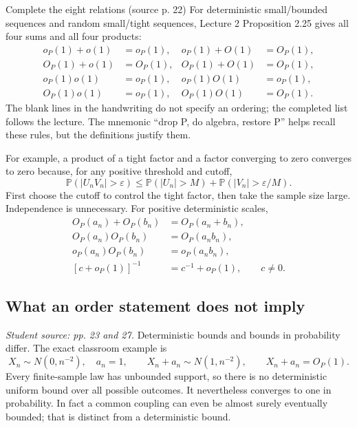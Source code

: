 \documentclass[12pt]{article}
\newcommand{\Prob}{\mathbb P}
\begin{document}
\begin{todobox}{Complete the eight relations (source p. 22)}
For deterministic small/bounded sequences and random small/tight sequences,
Lecture 2 Proposition 2.25 gives all four sums and all four products:
\begin{align}
 o_P(1)+o(1)&=o_P(1),& o_P(1)+O(1)&=O_P(1),\\
 O_P(1)+o(1)&=O_P(1),& O_P(1)+O(1)&=O_P(1),\\
 o_P(1)o(1)&=o_P(1),& o_P(1)O(1)&=o_P(1),\\
 O_P(1)o(1)&=o_P(1),& O_P(1)O(1)&=O_P(1).
\end{align}
The blank lines in the handwriting do not specify an ordering; the completed
list follows the lecture. The mnemonic ``drop P, do algebra, restore P''
helps recall these rules, but the definitions justify them.
\end{todobox}
For example, a product of a tight factor and a factor converging to zero
converges to zero because, for any positive threshold and cutoff,
\begin{equation}
 \Prob(|U_nV_n|>\varepsilon)
 \le \Prob(|U_n|>M)+\Prob(|V_n|>\varepsilon/M).
\end{equation}
First choose the cutoff to control the tight factor, then take the sample
size large. Independence is unnecessary. For positive deterministic scales,
\begin{align}
 O_P(a_n)+O_P(b_n)&=O_P(a_n+b_n),\\
 O_P(a_n)O_P(b_n)&=O_P(a_nb_n),\\
 o_P(a_n)O_P(b_n)&=o_P(a_nb_n),\\
 [c+o_P(1)]^{-1}&=c^{-1}+o_P(1),\qquad c\ne0.
\end{align}

\subsection{What an order statement does not imply}
\textit{Student source: pp. 23 and 27.}
Deterministic bounds and bounds in probability differ. The exact classroom
example is
\begin{equation}
 X_n\sim N(0,n^{-2}),\quad a_n=1,\qquad
 X_n+a_n\sim N(1,n^{-2}),\qquad X_n+a_n=O_P(1).
\end{equation}
Every finite-sample law has unbounded support, so there is no deterministic
uniform bound over all possible outcomes. It nevertheless converges to one
in probability. In fact a common coupling can even be almost surely
eventually bounded; that is distinct from a deterministic bound.
\end{document}
